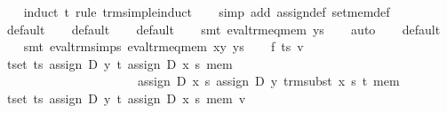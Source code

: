 \begin{isabellebody}
%
\isadelimproof
\ \ %
\endisadelimproof
%
\isatagproof
{}\isamarkupfalse%
\ {}induct\ t\ rule{}\ trm{}simple{}induct{}\isanewline
\ \ \isamarkupfalse%
\ {}simp\ add{}\ assign{}def\ set{}mem{}def{}\isanewline
\ \ \isamarkupfalse%
\ default\isanewline
\ \ \isamarkupfalse%
\ default\isanewline
\ \ \isamarkupfalse%
\ default\isanewline
\ \ \isamarkupfalse%
\ {}smt\ eval{}trm{}eq{}mem\ ys{}\isanewline
\ \ \isamarkupfalse%
\ auto\isanewline
\ \ \isamarkupfalse%
\ default\isanewline
\ \ \isamarkupfalse%
\ {}smt\ eval{}trm{}simps{}{}{}\ eval{}trm{}eq{}mem\ xy\ ys{}\isanewline
{}\isamarkupfalse%
\isanewline
\ \ \isamarkupfalse%
\ f\ ts\ v\isanewline
\ \ \isamarkupfalse%
\ {}{}t{}set\ ts{}\ assign\ D\ y\ t\ {}assign\ D\ x\ s\ mem{}\ {}\isanewline
\ \ \ \ \ \ \ \ \ \ \ \ \ \ \ \ \ \ \ \ \ \ assign\ D\ x\ s\ {}assign\ D\ y\ {}trm{}subst\ x\ s\ t{}\ mem{}{}\isanewline
\ \ \isamarkupfalse%
\ {}{}t{}set\ ts{}\ assign\ D\ y\ t\ {}assign\ D\ x\ s\ mem{}\ v\ {}\isanewline

\end{isabellebody}
